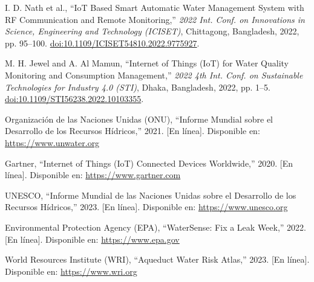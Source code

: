 \documentclass[conference]{IEEEtran}
\begin{document}
\begin{thebibliography}{99}
    I. D. Nath et al., ``IoT Based Smart Automatic Water Management System with RF Communication and Remote Monitoring,'' \textit{2022 Int. Conf. on Innovations in Science, Engineering and Technology (ICISET)}, Chittagong, Bangladesh, 2022, pp. 95–100. \href{https://doi.org/10.1109/ICISET54810.2022.9775927}{doi:10.1109/ICISET54810.2022.9775927}.

    M. H. Jewel and A. Al Mamun, ``Internet of Things (IoT) for Water Quality Monitoring and Consumption Management,'' \textit{2022 4th Int. Conf. on Sustainable Technologies for Industry 4.0 (STI)}, Dhaka, Bangladesh, 2022, pp. 1–5. \href{https://doi.org/10.1109/STI56238.2022.10103355}{doi:10.1109/STI56238.2022.10103355}.

    Organización de las Naciones Unidas (ONU), ``Informe Mundial sobre el Desarrollo de los Recursos Hídricos,'' 2021. [En línea]. Disponible en: \url{https://www.unwater.org}

    Gartner, ``Internet of Things (IoT) Connected Devices Worldwide,'' 2020. [En línea]. Disponible en: \url{https://www.gartner.com}

    UNESCO, ``Informe Mundial de las Naciones Unidas sobre el Desarrollo de los Recursos Hídricos,'' 2023. [En línea]. Disponible en: \url{https://www.unesco.org}

    Environmental Protection Agency (EPA), ``WaterSense: Fix a Leak Week,'' 2022. [En línea]. Disponible en: \url{https://www.epa.gov}

    World Resources Institute (WRI), ``Aqueduct Water Risk Atlas,'' 2023. [En línea]. Disponible en: \url{https://www.wri.org}

\end{thebibliography}
\end{document}
